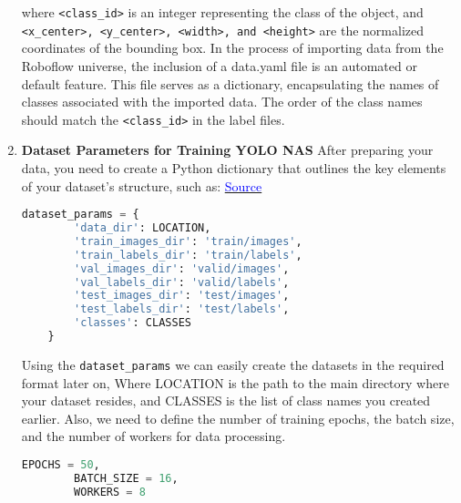 \begin{enumerate}
    where \verb|<class_id>| is an integer representing the class of the object, and 
    \texttt{<x\_center>, <y\_center>, <width>, and <height>}
    are the normalized coordinates of the bounding box.
   In the process of importing data from the Roboflow universe, the inclusion of a data.yaml file is an automated or default feature. This file serves as a dictionary, encapsulating the names of classes associated with the imported data.  
    The order of the class names should match the \texttt{<class\_id>} in the label files.
    \item \textbf{Dataset Parameters for Training YOLO NAS}
    After preparing your data, you need to create a Python dictionary that outlines the key elements of your dataset’s structure, such as: \href{https://learnopencv.com/train-yolo-nas-on-custom-dataset/}{\textcolor{blue}{Source}}
    \begin{lstlisting}[language=Python]
        dataset_params = {
        'data_dir': LOCATION,
        'train_images_dir': 'train/images',
        'train_labels_dir': 'train/labels',
        'val_images_dir': 'valid/images',
        'val_labels_dir': 'valid/labels',
        'test_images_dir': 'test/images',
        'test_labels_dir': 'test/labels',
        'classes': CLASSES
    }
    \end{lstlisting}
    Using the \texttt{dataset\_params} we can easily create the datasets in the required format later on,   Where LOCATION is the path to the main directory where your dataset resides, and CLASSES is the list of class names you created earlier. Also, we need to define the number of training epochs, the batch size, and the number of workers for data processing.
    \begin{lstlisting}[language=Python]
        EPOCHS = 50,
        BATCH_SIZE = 16,
        WORKERS = 8 
    \end{lstlisting}

  
    

\end{enumerate}
